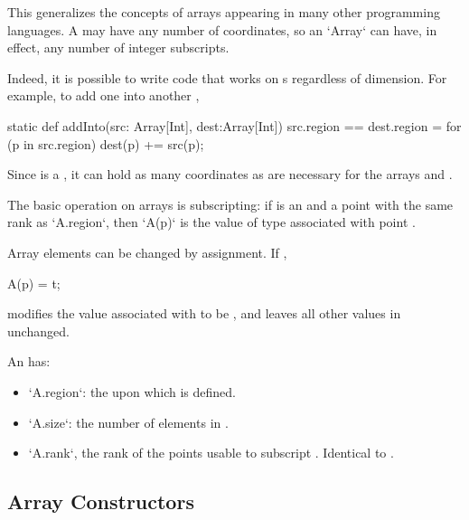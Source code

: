 This generalizes the concepts of arrays appearing in many other programming
languages.  A  may have any number of coordinates, so an
\xcd`Array` can have, in effect, any number of integer subscripts.  

Indeed, it is possible to write code that works on s regardless 
of dimension.  For example, to add one   into another
, 
\begin{xten}
static def addInto(src: Array[Int], dest:Array[Int])
  {src.region == dest.region}
  = {
    for (p in src.region) 
       dest(p) += src(p);
  }
\end{xten}
\noindent
Since  is a , it can hold as many coordinates as are
necessary for the arrays  and .

The basic operation on arrays is subscripting: if  is an 
and  a point with the same rank as \xcd`A.region`, then
\xcd`A(p)`
is the value of type  associated with point .

Array elements can be changed by assignment. If , 
\begin{xten}
A(p) = t;
\end{xten}
modifies the value associated with  to be , and leaves all other
values in  unchanged.

An   has: 
\begin{itemize}
\item \xcd`A.region`: the  upon which  is defined.
\item \xcd`A.size`: the number of elements in .
\item \xcd`A.rank`, the rank of the points usable to subscript .
      Identical to .
\end{itemize}

\subsection{Array Constructors}

